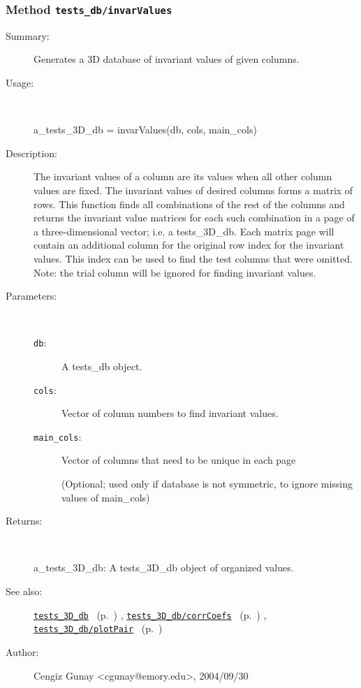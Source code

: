 \subsubsection[Method \texttt{invarValues}]{Method \texttt{tests\_db/invarValues}}%
%
\label{ref_tests_db__invarValues}%
\hypertarget{ref_tests_db__invarValues}{}%
\begin{description}
\item[Summary:]Generates a 3D database of invariant values of given columns.
%
\item[Usage:]~%
\begin{lyxcode}%
a\_tests\_3D\_db = invarValues(db, cols, main\_cols)
%
\end{lyxcode}%
%
\item[Description:]%
The invariant values of a column are its values when all other 
 column values are fixed. The invariant values of desired columns
 forms a matrix of rows. This function finds all combinations of the
 rest of the columns and returns the invariant value matrices 
 for each such combination in a page of a three-dimensional vector; 
 i.e. a tests\_3D\_db. Each matrix page will contain an additional 
 column for the original row index for the invariant values. This
 index can be used to find the test columns that were omitted.
 Note: the trial column will be ignored for finding invariant values.
\item[Parameters:]~
\begin{description}%
\item[\texttt{db}:]
 A tests\_db object.
\item[\texttt{cols}:]
 Vector of column numbers to find invariant values.
\item[\texttt{main\_cols}:]
 Vector of columns that need to be unique in each page 

(Optional; used only if database is not symmetric, to ignore 
missing values of main\_cols)\end{description}%
%
\item[Returns:]~

	a\_tests\_3D\_db: A tests\_3D\_db object of organized values.
%
%
\item[See also:]%
\hyperlink{ref_tests_3D_db}{\texttt{tests\_3D\_db}}%
\ (p.~\pageref{ref_tests_3D_db})%
%
, \hyperlink{ref_tests_3D_db__corrCoefs}{\texttt{tests\_3D\_db/corrCoefs}}%
\ (p.~\pageref{ref_tests_3D_db__corrCoefs})%
%
, \hyperlink{ref_tests_3D_db__plotPair}{\texttt{tests\_3D\_db/plotPair}}%
\ (p.~\pageref{ref_tests_3D_db__plotPair})%
%
%
\item[Author:]%
Cengiz Gunay <cgunay@emory.edu>, 2004/09/30%
\end{description}
\methodline%

